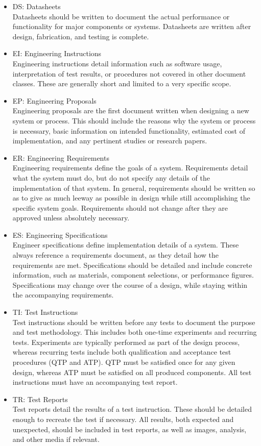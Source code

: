 \documentclass[12pt,article]{memoir}
\begin{document}
\begin{itemize}
\item DS: Datasheets\\
Datasheets should be written to document the actual performance or functionality for major components or systems. Datasheets are written after design, fabrication, and testing is complete.
\item EI: Engineering Instructions\\
Engineering instructions detail information such as software usage, interpretation of test results, or procedures not covered in other document classes. These are generally short and limited to a very specific scope.
\item EP: Engineering Proposals\\
Engineering proposals are the first document written when designing a new system or process. This should include the reasons why the system or process is necessary, basic information on intended functionality, estimated cost of implementation, and any pertinent studies or research papers.
\item ER: Engineering Requirements\\
Engineering requirements define the goals of a system. Requirements detail what the system must do, but do not specify any details of the implementation of that system. In general, requirements should be written so as to give as much leeway as possible in design while still accomplishing the specific system goals. Requirements should not change after they are approved unless absolutely necessary.
\item ES: Engineering Specifications\\
Engineer specifications define implementation details of a system. These always reference a requirements document, as they detail how the requirements are met. Specifications should be detailed and include concrete information, such as materials, component selections, or performance figures. Specifications may change over the course of a design, while staying within the accompanying requirements.
\item TI: Test Instructions\\
Test instructions should be written before any tests to document the purpose and test methodology. This includes both one-time experiments and recurring tests. Experiments are typically performed as part of the design process, whereas recurring tests include both qualification and acceptance test procedures (QTP and ATP). QTP must be satisfied once for any given design, whereas ATP must be satisfied on all produced components. All test instructions must have an accompanying test report.
\item TR: Test Reports\\
Test reports detail the results of a test instruction. These should be detailed enough to recreate the test if necessary. All results, both expected and unexpected, should be included in test reports, as well as images, analysis, and other media if relevant.
\end{itemize}
\end{document}
